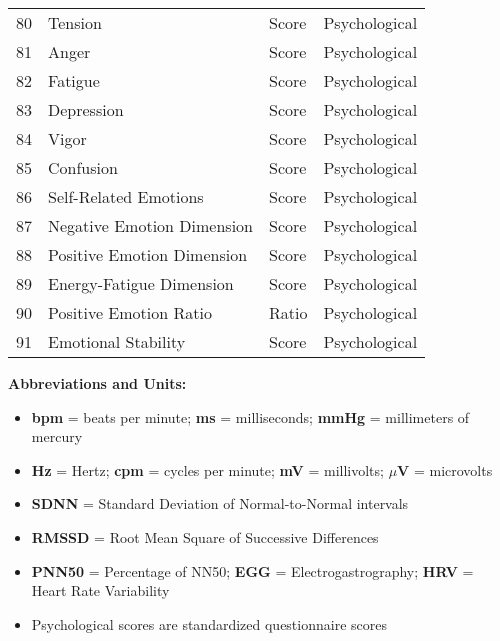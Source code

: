 \documentclass[11pt]{article}
\begin{document}
\begin{longtable}{p{1cm}p{7cm}p{3cm}p{4cm}}
80 & Tension & Score & Psychological \\
81 & Anger & Score & Psychological \\
82 & Fatigue & Score & Psychological \\
83 & Depression & Score & Psychological \\
84 & Vigor & Score & Psychological \\
85 & Confusion & Score & Psychological \\
86 & Self-Related Emotions & Score & Psychological \\
87 & Negative Emotion Dimension & Score & Psychological \\
88 & Positive Emotion Dimension & Score & Psychological \\
89 & Energy-Fatigue Dimension & Score & Psychological \\
90 & Positive Emotion Ratio & Ratio & Psychological \\
91 & Emotional Stability & Score & Psychological \\

\end{longtable}

\vspace{1cm}

\textbf{Abbreviations and Units:}
\begin{itemize}
\item \textbf{bpm} = beats per minute; \textbf{ms} = milliseconds; \textbf{mmHg} = millimeters of mercury
\item \textbf{Hz} = Hertz; \textbf{cpm} = cycles per minute; \textbf{mV} = millivolts; \textbf{$\mu$V} = microvolts
\item \textbf{SDNN} = Standard Deviation of Normal-to-Normal intervals
\item \textbf{RMSSD} = Root Mean Square of Successive Differences
\item \textbf{PNN50} = Percentage of NN50; \textbf{EGG} = Electrogastrography; \textbf{HRV} = Heart Rate Variability
\item Psychological scores are standardized questionnaire scores
\end{itemize}
\end{document}
